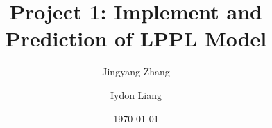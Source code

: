 \title{Project 1: Implement and Prediction of LPPL Model}
\author{Jingyang Zhang \and Iydon Liang}
\date{\today}

\maketitle\tableofcontents\clearpage







\clearpage

\clearpage


